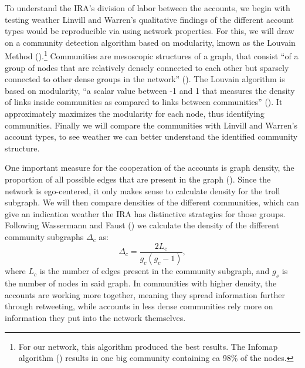 \documentclass[12pt, titlepage=true, toc=bib]{scrartcl}
\begin{document}
To understand the IRA's division of labor between the accounts, we begin with testing weather Linvill and Warren's qualitative findings of the different account types would be reproducible via using network properties. For this, we will draw on a community detection algorithm based on modularity, known as the Louvain Method (\cite{blondel_fast_2008}).\footnote{For our network, this algorithm produced the best results. The Infomap algorithm (\cite[cf.][]{rosvall_maps_2008}) results in one big community containing ca 98\% of the nodes.} Communities are mesoscopic structures of a graph, that consist ``of a group of nodes that are relatively densely connected to each other but sparsely connected to other dense groups in the network'' (\cite[1083]{porter_communities_2009}). The Louvain algorithm is based on modularity, ``a scalar value between -1 and 1 that measures the density of links inside communities as compared to links between communities'' (\cites[2]{blondel_fast_2008}[cf. also][1089]{porter_communities_2009}). It approximately maximizes the modularity for each node, thus identifying communities. Finally we will compare the communities with Linvill and Warren's account types, to see weather we can better understand the identified community structure.

One important measure for the cooperation of the accounts is graph density, the proportion of all possible edges that are present in the graph (\cite[101]{wasserman_social_1994}). Since the network is ego-centered, it only makes sense to calculate density for the troll subgraph. We will then compare densities of the different communities, which can give an indication weather the IRA has distinctive strategies for those groups. Following Wassermann and Faust (\cite*[102]{wasserman_social_1994}) we calculate the density of the different community subgraphs \( \Delta_{c} \) as: \[ \Delta_{c} = \frac{2L_{c}}{g_{c}(g_{c} - 1)} ,\] where \( L_{c} \) is the number of edges present in the community subgraph, and \( g_{s} \) is the number of nodes in said graph. In communities with higher density, the accounts are working more together, meaning they spread information further through retweeting, while accounts in less dense communities rely more on information they put into the network themselves.
\end{document}
